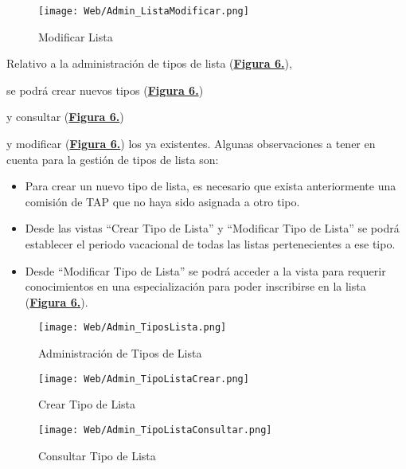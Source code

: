 \begin{figure}[!htbp]
  \centering
  \texttt{[image: Web/Admin\_ListaModificar.png]}
  \caption{Modificar Lista}
  \label{fig:Web_Admin_ListaModificar}
\end{figure}
\FloatBarrier

\addtocounter{figura_manual}{1} Relativo a la administración de tipos de lista (\textbf{\hyperref[fig:Web_Admin_TiposLista]{Figura 6.}}),\addtocounter{figura_manual}{1} se podrá crear nuevos tipos (\textbf{\hyperref[fig:Web_Admin_TipoListaCrear]{Figura 6.}})\addtocounter{figura_manual}{1} y consultar (\textbf{\hyperref[fig:Web_Admin_TipoListaConsultar]{Figura 6.}})\addtocounter{figura_manual}{1} y modificar (\textbf{\hyperref[fig:Web_Admin_TipoListaModificar]{Figura 6.}}) los ya existentes. Algunas observaciones a tener en cuenta para la gestión de tipos de lista son:
\begin{itemize}
  \item \addtocounter{figura_manual}{1} Para crear un nuevo tipo de lista, es necesario que exista anteriormente una comisión de TAP que no haya sido asignada a otro tipo.
  \item Desde las vistas ``Crear Tipo de Lista'' y ``Modificar Tipo de Lista'' se podrá establecer el periodo vacacional de todas las listas pertenecientes a ese tipo.
  \item Desde ``Modificar Tipo de Lista'' se podrá acceder a la vista para requerir conocimientos en una especialización para poder inscribirse en la lista (\textbf{\hyperref[fig:Web_Admin_TipoListaRequerirEspecializacion]{Figura 6.}}).
\end{itemize}

\begin{figure}[!htbp]
  \centering
  \texttt{[image: Web/Admin\_TiposLista.png]}
  \caption{Administración de Tipos de Lista}
  \label{fig:Web_Admin_TiposLista}
\end{figure}
\FloatBarrier

\begin{figure}[!htbp]
  \centering
  \texttt{[image: Web/Admin\_TipoListaCrear.png]}
  \caption{Crear Tipo de Lista}
  \label{fig:Web_Admin_TipoListaCrear}
\end{figure}
\FloatBarrier

\begin{figure}[!htbp]
  \centering
  \texttt{[image: Web/Admin\_TipoListaConsultar.png]}
  \caption{Consultar Tipo de Lista}
  \label{fig:Web_Admin_TipoListaConsultar}
\end{figure}
\FloatBarrier

